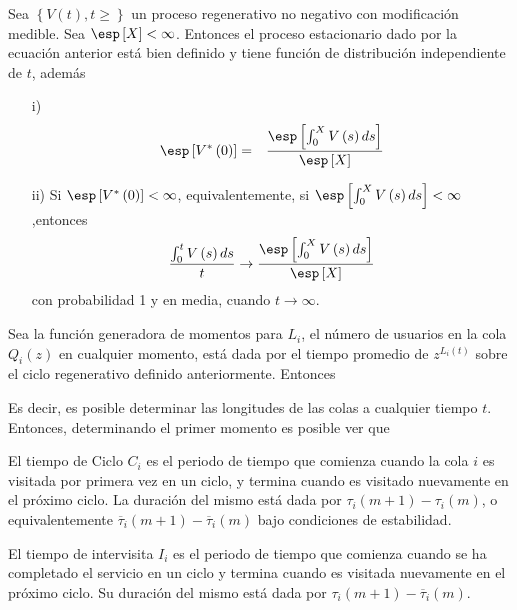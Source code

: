 \begin{Teo}
Sea $\left\{V\left(t\right),t\geq\right\}$ un proceso regenerativo no negativo con modificaci\'on medible. Sea $\esp\left[X\right]<\infty$. Entonces el proceso estacionario dado por la ecuaci\'on anterior est\'a bien definido y tiene funci\'on de distribuci\'on independiente de $t$, adem\'as
\begin{itemize}
\item[i)] \begin{eqnarray*}
\esp\left[V^{*}\left(0\right)\right]&=&\frac{\esp\left[\int_{0}^{X}V\left(s\right)ds\right]}{\esp\left[X\right]}\end{eqnarray*}
\item[ii)] Si $\esp\left[V^{*}\left(0\right)\right]<\infty$, equivalentemente, si $\esp\left[\int_{0}^{X}V\left(s\right)ds\right]<\infty$,entonces
\begin{eqnarray*}
\frac{\int_{0}^{t}V\left(s\right)ds}{t}\rightarrow\frac{\esp\left[\int_{0}^{X}V\left(s\right)ds\right]}{\esp\left[X\right]}
\end{eqnarray*}
con probabilidad 1 y en media, cuando $t\rightarrow\infty$.
\end{itemize}
\end{Teo}

Sea la funci\'on generadora de momentos para $L_{i}$, el n\'umero de usuarios en la cola $Q_{i}\left(z\right)$ en cualquier momento, est\'a dada por el tiempo promedio de $z^{L_{i}\left(t\right)}$ sobre el ciclo regenerativo definido anteriormente. Entonces 



Es decir, es posible determinar las longitudes de las colas a cualquier tiempo $t$. Entonces, determinando el primer momento es posible ver que


\begin{Def}
El tiempo de Ciclo $C_{i}$ es el periodo de tiempo que comienza cuando la cola $i$ es visitada por primera vez en un ciclo, y termina cuando es visitado nuevamente en el pr\'oximo ciclo. La duraci\'on del mismo est\'a dada por $\tau_{i}\left(m+1\right)-\tau_{i}\left(m\right)$, o equivalentemente $\overline{\tau}_{i}\left(m+1\right)-\overline{\tau}_{i}\left(m\right)$ bajo condiciones de estabilidad.
\end{Def}


\begin{Def}
El tiempo de intervisita $I_{i}$ es el periodo de tiempo que comienza cuando se ha completado el servicio en un ciclo y termina cuando es visitada nuevamente en el pr\'oximo ciclo. Su  duraci\'on del mismo est\'a dada por $\tau_{i}\left(m+1\right)-\overline{\tau}_{i}\left(m\right)$.
\end{Def}

